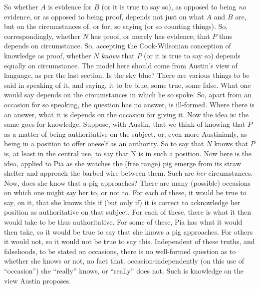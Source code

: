 So whether \( A \) is evidence for \( B \) (or it is true to say so), as opposed to being \emph{no} evidence, or as opposed to being proof, depends not just on what \( A \) and \( B \) are, but on the circumstances of, or for, so saying (or so counting things). So, correspondingly, whether \( N \) has proof, or merely has evidence, that \( P \) thus depends on circumstance. So, accepting the Cook-Wilsonian conception of knowledge as proof, whether \( N \) \emph{knows} that \( P \) (or it is true to say so) depends equally on circumstance. The model here should come from Austin's view of language, as per the last section. Is the sky blue? There are various things to be said in speaking of it, and saying, it to be blue, some true, some false. What one would say depends on the circumstances in which he so spoke. So, apart from an occasion for so speaking, the question has no answer, is ill-formed. Where there  is an answer, what it is depends on the occasion for giving it. Now the idea is: the same goes for knowledge. Suppose, with Austin, that we think of knowing that \( P \) as a matter of being authoritative on the subject, or, even more Austinianly, as being in a position to offer oneself as an authority. So to say that \( N \) knows that \( P \) is, at least in the central use, to say that N is in such a position. Now here is the idea, applied to Pia as she watches the (free range) pig emerge from its straw shelter and approach the barbed wire between them. Such are \emph{her} circumstances. Now, does she know that a pig approaches? There are many (possible) occasions on which one might say her to, or not to. For each of these, it would be true to say, on it, that she knows this if (but only if) it is correct to acknowledge her position as authoritative on that subject. For each of these, there is what it then would take to be thus authoritative. For some of these, Pia has what it would then take, so it would be true to say that she knows a pig approaches. For others it would not, so it would not be true to say this. Independent of these truths, and falsehoods, to be stated on occasions, there is no well-formed question as to whether she knows or not, no fact that, occasion-independently (on this use of ``occasion'') she ``really'' knows, or ``really'' does not. Such is knowledge on the view Austin proposes.

